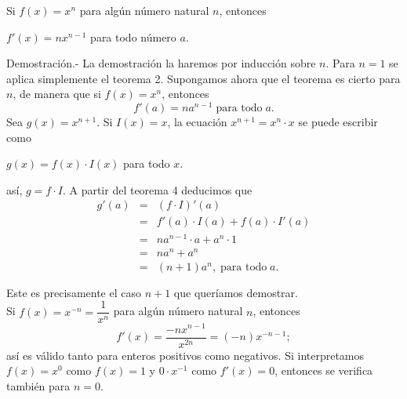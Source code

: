\begin{teo}
    Si $f(x)=x^n$ para algún número natural $n$, entonces
    \begin{center}
	$f'(x)=nx^{n-1}$ para todo número $a$.
    \end{center}
    \vspace{.5cm}
    	Demostración.-\; La demostración la haremos por inducción sobre $n$. Para $n=1$ se aplica simplemente el teorema 2. Supongamos ahora que el teorema es cierto para $n$, de manera que si $f(x)=x^n$, entonces 
	$$f'(a)=na^{n-1}\; \mbox{para todo}\; a.$$
	Sea $g(x)=x^{n+1}$. Si $I(x)=x$, la ecuación $x^{n+1}=x^n\cdot x$ se puede escribir como
	\begin{center}
	    $g(x)=f(x)\cdot I(x)$ para todo $x$.
	\end{center}
	así, $g=f\cdot I$. A partir del teorema 4 deducimos que 
	$$\begin{array}{rcl}
	    g'(a)&=&\left(f\cdot I\right)'(a)\\
		 &=&f'(a)\cdot I(a)+f(a)\cdot I'(a)\\
		 &=&na^{n-1}\cdot a + a^n \cdot 1\\
		 &=&na^n+a^n\\
		 &=&(n+1)a^n,\; \mbox{para todo}\; a.\\\\
	\end{array}$$
	Este es precisamente el caso $n+1$ que queríamos demostrar.\\
	Si $f(x)=x^{-n}=\dfrac{1}{x^n}$ para algún número natural $n$, entonces
	$$f'(x)=\dfrac{-nx^{n-1}}{x^{2n}}=(-n)x^{-n-1};$$
	así es válido tanto para enteros positivos como negativos. Si interpretamos $f(x)=x^0$ como $f(x)=1$ y $0\cdot x^{-1}$ como $f'(x)=0$, entonces se verifica también para $n=0$.\\\\
\end{teo}

